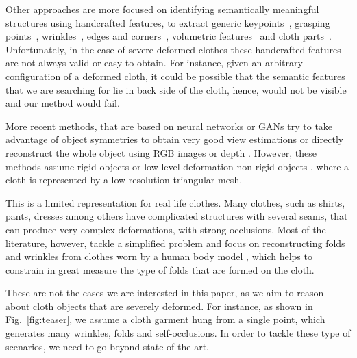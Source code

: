 Other approaches are more focused on identifying semantically meaningful structures using handcrafted features, to extract generic keypoints~\cite{Simo_ijcv2015}, grasping points~\cite{Ramisa_pr2016,doumanoglou2014active}, wrinkles~\cite{kapusta2019personalized,martinez2017recognition}, edges and corners~\cite{kampouris2016multi}, volumetric features~\cite{li2015folding} and cloth parts~\cite{Ramisa2012using}. Unfortunately, in the case of severe deformed clothes these handcrafted features are not always valid or easy to obtain. For instance, given an arbitrary configuration of a deformed cloth, it could be possible that the semantic features that we are searching for lie in back side of the cloth, hence, would not be visible and our method would fail.

More recent methods, that are based on neural networks \cite{pumarola2020c,haeni2020corn,xie2019pix2vox} or GANs \cite{HoloGAN2019} try to take advantage of object symmetries to obtain very good view estimations or directly reconstruct the whole object using RGB images \cite{zhou2020learning, yan2016perspective, varley2017shape} or depth \cite{yang-depth-w}. However, these methods assume rigid objects or low level deformation non rigid objects \cite{Tsoli_2019_ICCV, golyanik2018hdm}, where a cloth is represented by a low resolution triangular mesh.

This is a limited representation for  real life clothes. Many clothes, such as shirts, pants, dresses among others have complicated structures with several seams, that can produce very complex deformations, with strong occlusions. Most of the literature, however, tackle a simplified problem and focus on    reconstructing folds and wrinkles from clothes worn by a human body model \cite{Gundogdu-ICCV-2019, Santesteban-EG-2019, SIZER_Dataset, Patel_2020_CVPR}, which helps to constrain in great measure the type of folds that are formed on the cloth.

These are not the cases we are interested in this paper, as we aim to reason about cloth objects that are severely deformed. 
For instance, as shown in Fig.~\ref{fig:teaser}, we assume a cloth garment hung from a single point, which generates many wrinkles, folds and self-occlusions. In order to tackle these type of scenarios, we need to go beyond state-of-the-art.

